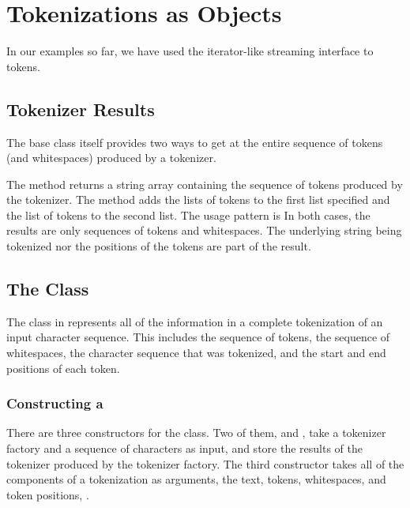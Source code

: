 \section{Tokenizations as Objects}

In our examples so far, we have used the iterator-like streaming
interface to tokens. 

\subsection{Tokenizer Results}

The  base class itself provides two ways to get at the
entire sequence of tokens (and whitespaces) produced by a tokenizer.  

The method  returns a string array containing the
sequence of tokens produced by the tokenizer.  
%
%
The method  adds the lists
of tokens to the first list specified and the list of tokens to the
second list.  The usage pattern is
%
%
In both cases, the results are only sequences of tokens and
whitespaces.  The underlying string being tokenized nor the
positions of the tokens are part of the result.

\subsection{The  Class}

The class  in 
represents all of the information in a complete tokenization of an
input character sequence.  This includes the sequence of tokens, the
sequence of whitespaces, the character sequence that was tokenized,
and the start and end positions of each token.

\subsubsection{Constructing a }

There are three constructors for the  class.  Two
of them,  and
, take a tokenizer
factory and a sequence of characters as input, and store the results
of the tokenizer produced by the tokenizer factory.  The third
constructor takes all of the components of a tokenization as
arguments, the text, tokens, whitespaces, and token positions,
.


